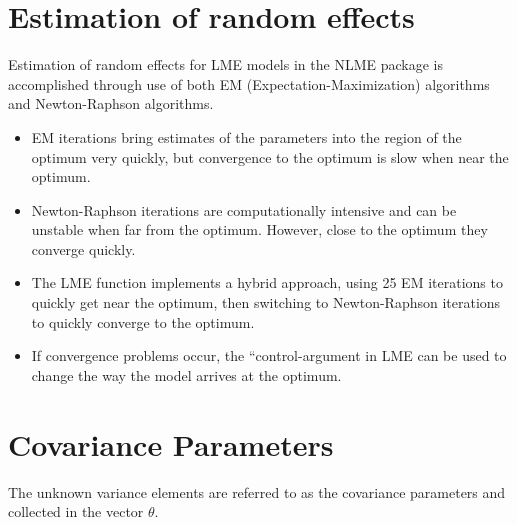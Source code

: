 \documentclass[MAIN.tex]{subfiles}
\begin{document}

\section{Estimation of random effects}

Estimation of random effects for LME models in the NLME package is accomplished through use
of both EM (Expectation-Maximization) algorithms and Newton-Raphson algorithms.
\begin{itemize}
	\item EM iterations bring estimates of the parameters into the region of the optimum very quickly, but
	convergence to the optimum is slow when near the optimum.
	\item Newton-Raphson iterations are computationally intensive and can be unstable when far from the
	optimum. However, close to the optimum they converge quickly.
	\item The LME function implements a hybrid approach, using 25 EM iterations to quickly get near the
	optimum, then switching to Newton-Raphson iterations to quickly converge to the optimum. \item If
	convergence problems occur, the ``control-argument in LME can be used to change the way the
	model arrives at the optimum.
\end{itemize}





\section{Covariance Parameters} %
The unknown variance elements are referred to as the covariance parameters and collected in the vector $\theta$.



\end{document}
